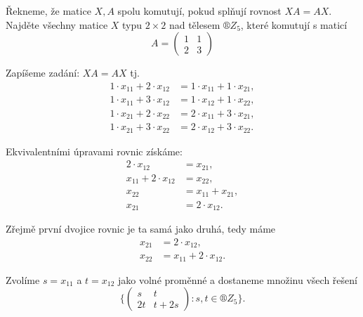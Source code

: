 \documentclass[12pt]{article}					%
\begin{document}
    \pagebreak

    \begin{priklad}[3.2]
        Řekneme, že matice $X, A$ spolu komutují, pokud splňují rovnost $XA = AX$. Najděte všechny matice $X$ typu $2\times 2$ nad tělesem $®Z_5$, které komutují s maticí
        $$ A = \begin{pmatrix} 1 & 1 \\ 2 & 3 \end{pmatrix} $$ 
        
        \begin{reseni}
            Zapíšeme zadání: $XA = AX$ tj.
            \begin{align*}
                1·x_{11} + 2·x_{12} &= 1·x_{11} + 1·x_{21},\\
                1·x_{11} + 3·x_{12} &= 1·x_{12} + 1·x_{22},\\
                1·x_{21} + 2·x_{22} &= 2·x_{11} + 3·x_{21},\\
                1·x_{21} + 3·x_{22} &= 2·x_{12} + 3·x_{22}.
            \end{align*}

            Ekvivalentními úpravami rovnic získáme:
            \begin{align*}
                2·x_{12} &= x_{21},\\
                x_{11} + 2·x_{12} &= x_{22},\\
                x_{22} &= x_{11} + x_{21},\\
                x_{21} &= 2·x_{12}.
            \end{align*}

            Zřejmě první dvojice rovnic je ta samá jako druhá, tedy máme
            \begin{align*}
                x_{21} &= 2·x_{12},\\
                x_{22} &= x_{11} + 2·x_{12}.
            \end{align*}

            Zvolíme $s=x_{11}$ a $t=x_{12}$ jako volné proměnné a dostaneme množinu všech řešení
            $$ \{\begin{pmatrix} s & t \\ 2t & t + 2s \end{pmatrix}: s, t \in ®Z_5 \}. $$
        \end{reseni}
    \end{priklad}
\end{document}
